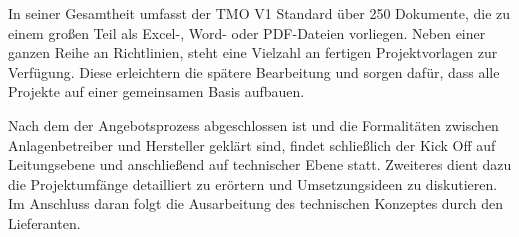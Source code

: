 In seiner Gesamtheit umfasst der TMO V1 Standard über 250 Dokumente, die zu einem großen Teil als Excel-, Word- oder PDF-Dateien vorliegen. Neben einer ganzen Reihe an Richtlinien, steht eine Vielzahl an fertigen Projektvorlagen zur Verfügung. Diese erleichtern die spätere Bearbeitung und sorgen dafür, dass alle Projekte auf einer gemeinsamen Basis aufbauen.

Nach dem der Angebotsprozess abgeschlossen ist und die Formalitäten zwischen Anlagenbetreiber und Hersteller geklärt sind, findet schließlich der Kick Off auf Leitungsebene und anschließend auf technischer Ebene statt. Zweiteres dient dazu die Projektumfänge detailliert zu erörtern und Umsetzungsideen zu diskutieren. Im Anschluss daran folgt die Ausarbeitung des technischen Konzeptes durch den Lieferanten.
